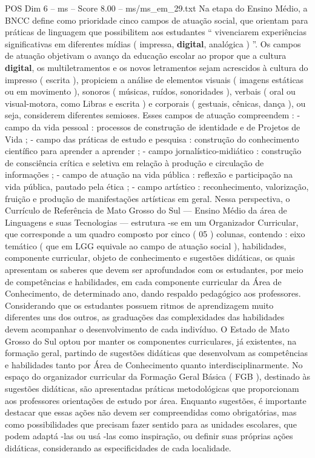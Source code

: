 \begin{textsample}{POS Dim 6 – ms – Score 8.00 – ms/ms\_em\_29.txt}
Na etapa do Ensino Médio, a BNCC define como prioridade cinco campos de atuação social, que orientam para práticas de linguagem que possibilitem aos estudantes “ vivenciarem experiências significativas em diferentes mídias ( impressa, \textbf{digital}, analógica ) ”.
Os campos de atuação objetivam o avanço da educação escolar ao propor que a cultura \textbf{digital}, os multiletramentos e os novos letramentos sejam acrescidos à cultura do impresso ( escrita ), propiciem a análise de elementos visuais ( imagens estáticas ou em movimento ), sonoros ( músicas, ruídos, sonoridades ), verbais ( oral ou visual-motora, como Libras e escrita ) e corporais ( gestuais, cênicas, dança ), ou seja, considerem diferentes semioses.
Esses campos de atuação compreendem : - campo da vida pessoal : processos de construção de identidade e de Projetos de Vida ; - campo das práticas de estudo e pesquisa : construção do conhecimento científico para aprender a aprender ; - campo jornalístico-midiático : construção de consciência crítica e seletiva em relação à produção e circulação de informações ; - campo de atuação na vida pública : reflexão e participação na vida pública, pautado pela ética ; - campo artístico : reconhecimento, valorização, fruição e produção de manifestações artísticas em geral.
Nessa perspectiva, o Currículo de Referência de Mato Grosso do Sul — Ensino Médio da área de Linguagens e suas Tecnologias — estrutura -se em um Organizador Curricular, que corresponde a um quadro composto por cinco ( 05 ) colunas, contendo : eixo temático ( que em LGG equivale ao campo de atuação social ), habilidades, componente curricular, objeto de conhecimento e sugestões didáticas, os quais apresentam os saberes que devem ser aprofundados com os estudantes, por meio de competências e habilidades, em cada componente curricular da Área de Conhecimento, de determinado ano, dando respaldo pedagógico aos professores.
Considerando que os estudantes possuem ritmos de aprendizagem muito diferentes uns dos outros, as graduações das complexidades das habilidades devem acompanhar o desenvolvimento de cada indivíduo.
O Estado de Mato Grosso do Sul optou por manter os componentes curriculares, já existentes, na formação geral, partindo de sugestões didáticas que desenvolvam as competências e habilidades tanto por Área de Conhecimento quanto interdisciplinarmente.
No espaço do organizador curricular da Formação Geral Básica ( FGB ), destinado às sugestões didáticas, são apresentadas práticas metodológicas que proporcionam aos professores orientações de estudo por área.
Enquanto sugestões, é importante destacar que essas ações não devem ser compreendidas como obrigatórias, mas como possibilidades que precisam fazer sentido para as unidades escolares, que podem adaptá -las ou usá -las como inspiração, ou definir suas próprias ações didáticas, considerando as especificidades de cada localidade.

\end{textsample}
